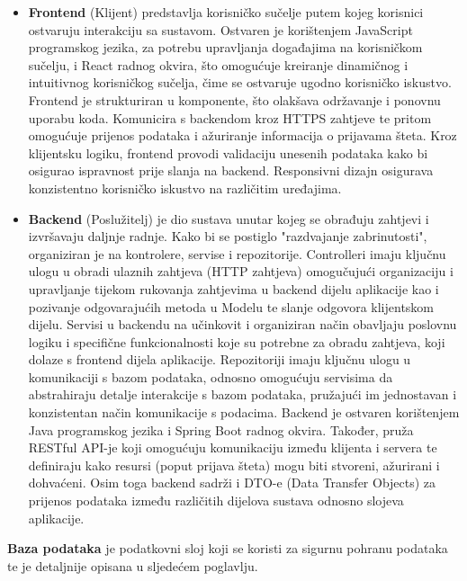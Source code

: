\begin{itemize}
	\item \textbf{Frontend} (Klijent) predstavlja korisničko sučelje putem kojeg korisnici ostvaruju interakciju sa sustavom. Ostvaren je korištenjem JavaScript programskog jezika, za potrebu upravljanja događajima na korisničkom sučelju, i React radnog okvira, što omogućuje kreiranje dinamičnog i intuitivnog korisničkog sučelja, čime se ostvaruje ugodno korisničko iskustvo. Frontend je strukturiran u komponente, što olakšava održavanje i ponovnu uporabu koda. Komunicira s backendom kroz HTTPS zahtjeve te pritom omogućuje prijenos podataka i ažuriranje informacija o prijavama šteta. Kroz klijentsku logiku, frontend provodi validaciju unesenih podataka kako bi osigurao ispravnost prije slanja na backend. Responsivni dizajn osigurava konzistentno korisničko iskustvo na različitim uređajima.	
	\item \textbf{Backend} (Poslužitelj) je dio sustava unutar kojeg se obrađuju zahtjevi i izvršavaju daljnje radnje. Kako bi se postiglo "razdvajanje zabrinutosti", organiziran je na kontrolere, servise i repozitorije. Controlleri imaju ključnu ulogu u obradi ulaznih zahtjeva (HTTP zahtjeva) omogučujući organizaciju i upravljanje tijekom rukovanja zahtjevima u backend dijelu aplikacije kao i pozivanje odgovarajućih metoda u Modelu te slanje odgovora klijentskom dijelu. Servisi u backendu na učinkovit i organiziran način obavljaju poslovnu logiku i specifične funkcionalnosti koje su potrebne za obradu zahtjeva, koji dolaze s frontend dijela aplikacije. Repozitoriji imaju ključnu ulogu u komunikaciji s bazom podataka, odnosno omogućuju servisima da abstrahiraju detalje interakcije s bazom podataka, pružajući im jednostavan i konzistentan način komunikacije s podacima. Backend je ostvaren korištenjem Java programskog jezika i Spring Boot radnog okvira. Također, pruža RESTful API-je koji omogućuju komunikaciju između klijenta i servera te definiraju kako resursi (poput prijava šteta) mogu biti stvoreni, ažurirani i dohvaćeni. Osim toga backend sadrži i DTO-e (Data Transfer Objects) za prijenos podataka između različitih dijelova sustava odnosno slojeva aplikacije. 
\end{itemize}

\noindent \textbf{Baza podataka} je podatkovni sloj koji se koristi za sigurnu pohranu podataka te je detaljnije opisana u sljedećem poglavlju.

